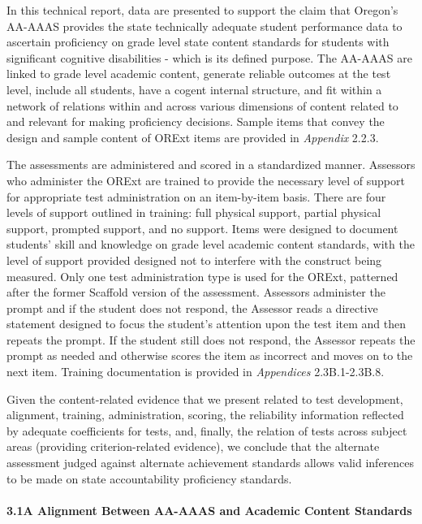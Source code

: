 \documentclass[]{article}
\let\oldparagraph\paragraph
\renewcommand{\paragraph}[1]{\oldparagraph{#1}\mbox{}}
\begin{document}
In this technical report, data are presented to support the claim that
Oregon's AA-AAAS provides the state technically adequate student
performance data to ascertain proficiency on grade level state content
standards for students with significant cognitive disabilities - which
is its defined purpose. The AA-AAAS are linked to grade level academic
content, generate reliable outcomes at the test level, include all
students, have a cogent internal structure, and fit within a network of
relations within and across various dimensions of content related to and
relevant for making proficiency decisions. Sample items that convey the
design and sample content of ORExt items are provided in \emph{Appendix}
2.2.3.

The assessments are administered and scored in a standardized manner.
Assessors who administer the ORExt are trained to provide the necessary
level of support for appropriate test administration on an item-by-item
basis. There are four levels of support outlined in training: full
physical support, partial physical support, prompted support, and no
support. Items were designed to document students' skill and knowledge
on grade level academic content standards, with the level of support
provided designed not to interfere with the construct being measured.
Only one test administration type is used for the ORExt, patterned after
the former Scaffold version of the assessment. Assessors administer the
prompt and if the student does not respond, the Assessor reads a
directive statement designed to focus the student's attention upon the
test item and then repeats the prompt. If the student still does not
respond, the Assessor repeats the prompt as needed and otherwise scores
the item as incorrect and moves on to the next item. Training
documentation is provided in \emph{Appendices} 2.3B.1-2.3B.8.

Given the content-related evidence that we present related to test
development, alignment, training, administration, scoring, the
reliability information reflected by adequate coefficients for tests,
and, finally, the relation of tests across subject areas (providing
criterion-related evidence), we conclude that the alternate assessment
judged against alternate achievement standards allows valid inferences
to be made on state accountability proficiency standards.

\hypertarget{a-alignment-between-aa-aaas-and-academic-content-standards}{%
\paragraph{3.1A Alignment Between AA-AAAS and Academic Content
Standards}\label{a-alignment-between-aa-aaas-and-academic-content-standards}}
\end{document}
